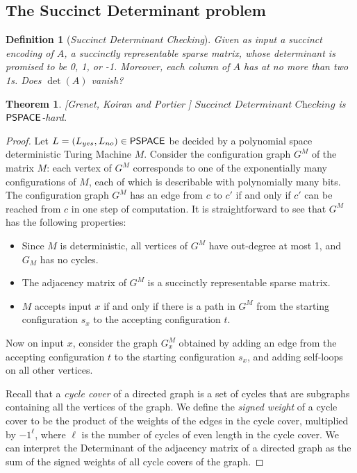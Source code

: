 \documentclass[11pt]{article}
\newtheorem{theorem}{Theorem}
\newtheorem{definition}{Definition}
\theoremstyle{definition}
\theoremstyle{remark}
\newcommand\PSPACE{{\sf{PSPACE}}}
\newcommand\succdet{\textit{Succinct Determinant Checking}}
\begin{document}
\subsection{The Succinct Determinant problem}
\begin{definition}[\succdet]
Given as input a succinct encoding of $A$, a succinctly representable sparse matrix, whose determinant is promised to be 0, 1, or -1. Moreover, each column of $A$ has at no more than two 1s.  Does $\det(A)$ vanish?
\end{definition}
\begin{theorem}\label{thm:succdet}[Grenet, Koiran and Portier \cite{GKP13}]
$\succdet$ is $\PSPACE$-hard.
\end{theorem}
\begin{proof}
Let $L=(L_{yes},L_{no}) \in \PSPACE$ be decided by a polynomial space deterministic Turing Machine $M$. Consider the configuration graph $G^M$ of the matrix $M$: each vertex of $G^M$ corresponds to one of the exponentially many configurations of $M$, each of which is describable with polynomially many bits. The configuration graph $G^M$ has an edge from $c$ to $c'$ if and only if $c'$ can be reached from $c$ in one step of computation. It is straightforward to see that $G^M$ has the following properties:
\begin{itemize}
\item Since $M$ is deterministic, all vertices of $G^M$ have out-degree at most 1, and $G_M$ has no cycles.
\item The adjacency matrix of $G^M$ is a succinctly representable sparse matrix.
\item $M$ accepts input $x$ if and only if there is a path in $G^M$ from the starting configuration $s_x$ to the accepting configuration $t$.
\end{itemize}

Now on input $x$, consider the graph $G^M_x$ obtained by adding an edge from the accepting configuration $t$ to the starting configuration $s_x$, and adding self-loops on all other vertices. 

Recall that a {\sl cycle cover} of a directed graph is a set of cycles that are subgraphs containing all the vertices of the graph.  We define the {\sl signed weight} of a cycle cover to be the product of the weights of the edges in the cycle cover, multiplied by $-1^\ell$, where $\ell$ is the number of cycles of even length in the cycle cover.  We can interpret the Determinant of the adjacency matrix of a directed graph as the sum of the signed weights of all cycle covers of the graph. 


\end{proof}
\end{document}
